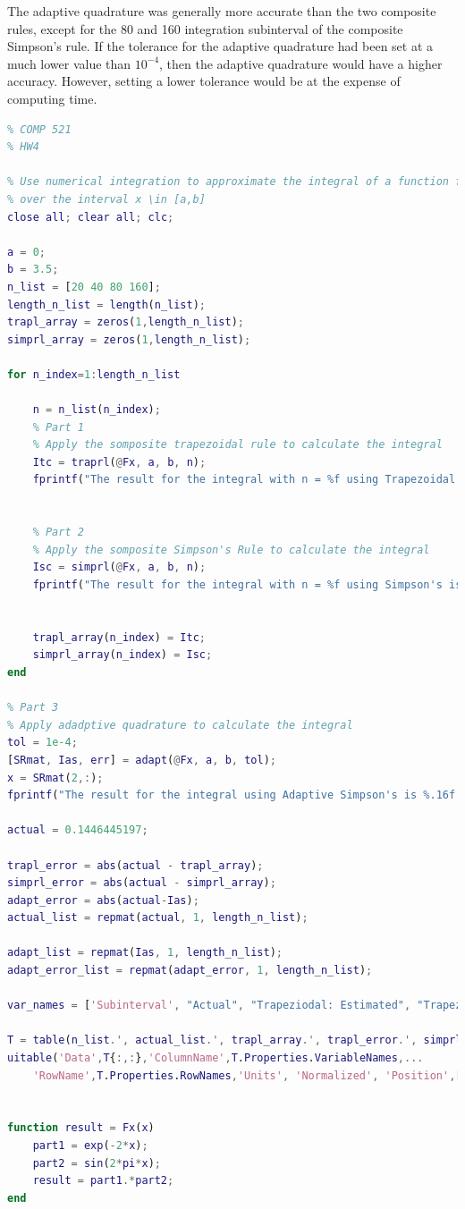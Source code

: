 \documentclass[12pt,letterpaper]{article}
\begin{document}
The adaptive quadrature was generally more accurate than the two composite rules, except for the 80 and 160 integration subinterval of the composite Simpson's rule. If the tolerance for the adaptive quadrature had been set at a much lower value than $10^{-4}$, then the adaptive quadrature would have a higher accuracy. However, setting a lower tolerance would be at the expense of computing time.

\pagebreak
{}
\begin{lstlisting}[language = Matlab]
%% Zack Humphries
% COMP 521
% HW4

% Use numerical integration to approximate the integral of a function f(x)
% over the interval x \in [a,b]
close all; clear all; clc;

a = 0;
b = 3.5;
n_list = [20 40 80 160];
length_n_list = length(n_list);
trapl_array = zeros(1,length_n_list);
simprl_array = zeros(1,length_n_list);

for n_index=1:length_n_list

    n = n_list(n_index);
    % Part 1
    % Apply the somposite trapezoidal rule to calculate the integral
    Itc = traprl(@Fx, a, b, n);
    fprintf("The result for the integral with n = %f using Trapezoidal is %.16f \n", n, Itc);
    
    
    % Part 2
    % Apply the somposite Simpson's Rule to calculate the integral
    Isc = simprl(@Fx, a, b, n);
    fprintf("The result for the integral with n = %f using Simpson's is %.16f \n", n, Isc);
    
        
    trapl_array(n_index) = Itc;
    simprl_array(n_index) = Isc;
end

% Part 3
% Apply adadptive quadrature to calculate the integral
tol = 1e-4;
[SRmat, Ias, err] = adapt(@Fx, a, b, tol);
x = SRmat(2,:);
fprintf("The result for the integral using Adaptive Simpson's is %.16f \n", Ias);

actual = 0.1446445197;

trapl_error = abs(actual - trapl_array);
simprl_error = abs(actual - simprl_array);
adapt_error = abs(actual-Ias);
actual_list = repmat(actual, 1, length_n_list);

adapt_list = repmat(Ias, 1, length_n_list);
adapt_error_list = repmat(adapt_error, 1, length_n_list);

var_names = ['Subinterval', "Actual", "Trapeziodal: Estimated", "Trapezoidal: Absolute Error", "Simpsons: Estimated", "Simpsons: Absolute Error", "Quadrature: Estimated", "Quadrature: Absolute Error"];

T = table(n_list.', actual_list.', trapl_array.', trapl_error.', simprl_array.', simprl_error.', adapt_list.', adapt_error_list.', VariableNames=var_names)
uitable('Data',T{:,:},'ColumnName',T.Properties.VariableNames,...
    'RowName',T.Properties.RowNames,'Units', 'Normalized', 'Position',[0, 0, 1, 1]);


function result = Fx(x)
    part1 = exp(-2*x);
    part2 = sin(2*pi*x);
    result = part1.*part2;
end
\end{lstlisting}
\end{document}
